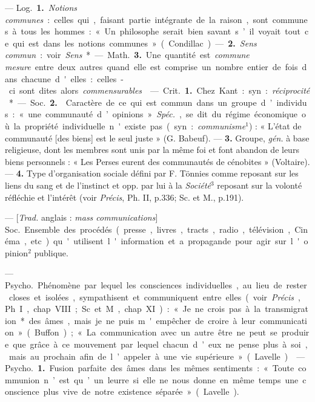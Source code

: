 \begin{itemize}[leftmargin=1cm, label=, itemsep=11pt]
 — \si{Log.} {\bf 1.} {\it Notions communes} : celles qui, faisant partie intégrante de la raison, sont communes
à tous les hommes : « Un philosophe serait bien savant s’il voyait
tout ce qui est dans les notions
communes » (Condillac). — {\bf 2.} {\it Sens
commun} : voir {\it Sens}*.

— \si{Math.} {\bf 3.} Une quantité est
{\it commune mesure} entre deux autres
quand elle est comprise un nombre
entier de fois dans chacune d'elles :
celles-ci sont dites alors {\it commensurables}.

 — \si{Crit.} {\bf 1.} Chez Kant :
syn. : {\it réciprocité}*.

— \si{Soc.} {\bf 2.}  Caractère de ce qui
est commun dans un groupe d’individus : « une communauté d’opinions ». {\it Spéc.}, se dit du régime économique où la propriété individuelle n'existe pas (syn. : {\it communisme}$^1$) : « L'état de communauté
[des biens] est le seul juste » (G. Babeuf). — {\bf 3.}  Groupe,  {\it gén.} à base
religieuse, dont les membres sont
unis par la même foi et font abandon
de leurs biens personnels : « Les
Perses eurent des communautés de
cénobites » (Voltaire). — {\bf 4.} Type
d'organisation sociale défini par
F. Tönnies comme reposant sur les
liens du sang et de l'instinct et opp.
par lui à la {\it Société}$^3$ reposant sur la
volonté réfléchie et l'intérêt (voir
{\it Précis}, Ph. II, p.336; Sc. et M., p.191).

 — [{\it Trad.} anglais : {\it mass
communications}] \si{Soc.} Ensemble des procédés (presse, livres, tracts,
radio, télévision, Cinéma, etc.) qu'utilisent l'information et a propagande
pour agir sur l'opinion$^2$ publique.

 —
\si{Psycho.} Phénomène par lequel les
consciences individuelles, au lieu de
rester closes et isolées, sympathisent
et communiquent entre elles (voir
 {\it Précis}, Ph. I, chap. VIII; Sc. et M.,
chap. XI) : « Je ne crois pas à la
transmigration* des âmes, mais je
ne puis m'empêcher de croire à leur
communication » (Buffon); « La
communication avec un autre être
ne peut se produire que grâce à ce
mouvement par lequel chacun d’eux
ne pense plus à soi, mais au prochain
afin de l’appeler à une vie supérieure » (Lavelle).

 — \si{Psycho.} {\bf 1.} Fusion parfaite des âmes dans les mêmes sentiments : « Toute communion n’est
qu’un leurre si elle ne nous donne en
même temps une conscience plus
vive de notre existence séparée »
(Lavelle).


\end{itemize}
